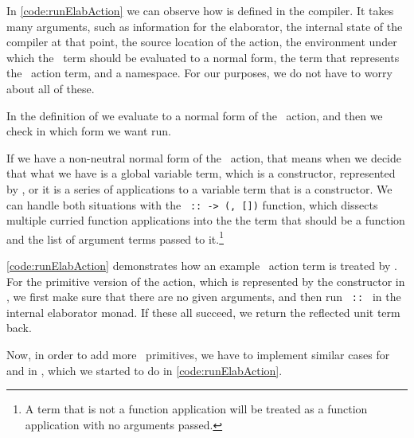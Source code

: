 In \autoref{code:runElabAction} we can observe how  is
defined in the compiler.
It takes many arguments, such as information for the elaborator, the internal
state of the compiler at that point, the source location of the action, the
environment under which the \Elab\ term should be evaluated to a normal form, the
term that represents the \Elab\ action term, and a namespace.  For our purposes,
we do not have to worry about all of these.

In the definition of  we evaluate  to a normal form
of the \Elab\ action, and then we check in  which form we want run.

If we have a non-neutral normal form of the \Elab\ action, that means when we decide
that what we have is a global variable term, which is a constructor, represented by
, or it is a series of applications to a variable term that is a
constructor. We can handle both situations with the
\texttt{ ::  -> (, [])} function,
which dissects multiple curried function applications into the the term
that should be a function and the list of argument terms passed to
it.\footnote{A term that is not a function application will be treated as a
function application with no arguments passed.}

\autoref{code:runElabAction} demonstrates how an example \Elab\ action
term is treated by . For the primitive version of the 
action, which is represented by the  constructor in \Elab,
we first make sure that there are no given arguments, and then run
\texttt{ ::   \ty{()}} in the internal elaborator
monad. If these all succeed, we return the reflected unit term back.

Now, in order to add more \Elab\ primitives, we have to implement similar cases
for  and  in , which
we started to do in \autoref{code:runElabAction}.


